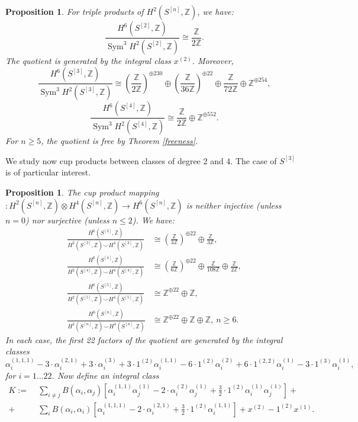 \documentclass{amsart}
\DeclareMathOperator{\Sym}{Sym}
\newcommand{\hilb}[1]{^{[#1]}}
\newcommand{\One}{1}
\newcommand{\IZ}{\mathbb{Z}}
\theoremstyle{plain}
\newtheorem{proposition}[theorem]{Proposition}
\theoremstyle{definition}
\theoremstyle{remark}
\begin{document}
\begin{proposition} For triple products of $H^2(S\hilb{n},\IZ)$, we have:
$$
\frac{H^6(S\hilb{2},\IZ)}{\Sym^3 H^2(S\hilb{2},\IZ)} \cong 
\frac{\IZ}{2\IZ}.
$$
The quotient is generated by the integral class $x^{(2)}$. Moreover,
$$
\frac{H^6(S\hilb{3},\IZ)}{\Sym^3 H^2(S\hilb{3},\IZ)} \cong  \left(\frac{\IZ}{2\IZ}\right)^{\oplus 230}\oplus \left(\frac{\IZ}{36\IZ}\right)^{\oplus 22}\oplus \frac{\IZ}{72\IZ} \oplus \IZ^{\oplus 254},
$$
$$
\frac{H^6(S\hilb{4},\IZ)}{\Sym^3 H^2(S\hilb{4},\IZ)} \cong  \frac{\IZ}{2\IZ} \oplus \IZ^{\oplus 552}.
$$
For $n\geq 5$, the quotient is free by Theorem \ref{freeness}.
\end{proposition}
We study now cup products between classes of degree 2 and 4. The case of $S\hilb{3}$ is of particular interest.
\begin{proposition} \label{p24}The cup product mapping $ : H^2(S\hilb{n},\IZ)\otimes H^4(S\hilb{n},\IZ) \rightarrow H^6(S\hilb{n},\IZ) $ is neither injective (unless $n=0$) nor surjective (unless $n\leq 2$). We have:
\setcounter{equation}{0} 
\begin{align} 
\frac{H^6(S\hilb{3},\IZ)}{H^2(S\hilb{3},\IZ)\smile H^4(S\hilb{3},\IZ)} &\cong \left(\frac{\IZ}{3\IZ}\right)^{\oplus 22} \oplus \frac{\IZ}{3\IZ},
\\
\frac{H^6(S\hilb{4},\IZ)}{H^2(S\hilb{4},\IZ)\smile H^4(S\hilb{4},\IZ)} &\cong  \left(\frac{\IZ}{6\IZ}\right)^{\oplus 22}\oplus\frac{\IZ}{108\IZ} \oplus\frac{\IZ}{2\IZ} ,
\\
\frac{H^6(S\hilb{5},\IZ)}{H^2(S\hilb{5},\IZ)\smile H^4(S\hilb{5},\IZ)} &\cong 
 \IZ^{\oplus 22} \oplus \IZ,
\\
\frac{H^6(S\hilb{n},\IZ)}{H^2(S\hilb{n},\IZ)\smile H^4(S\hilb{n},\IZ)} &\cong 
 \IZ^{\oplus 22} \oplus \IZ\oplus\IZ, \ n\geq 6.
\end{align}
In each case, the first 22 factors of the quotient are generated by the integral classes 
 $$
\alpha_i^{(1,1,1)} -3\cdot \alpha_i^{(2,1)} + 3\cdot \alpha_i^{(3)}+ 3 \cdot \One^{(2)}\alpha_i^{(1,1)} -6\cdot \One^{(2)}\alpha_i^{(2)}+6\cdot \One^{(2,2)}\alpha_i^{(1)}-3\cdot \One^{(3)}\alpha_i^{(1)},
$$ 
for $ i=1\ldots 22$. Now define an integral class
\begin{align*}
K:=&\;\sum_{i\neq j} B(\alpha_i,\alpha_j)\left[\alpha_i^{(1,1)}\alpha_j^{(1)} - 2\cdot\alpha_i^{(2)}\alpha_j^{(1)}+\frac{3}{2}\cdot \One^{(2)}\alpha_i^{(1)}\alpha_j^{(1)} \right] +\\
+&\;\sum_{i}B(\alpha_i,\alpha_i)\left[\alpha_i^{(1,1,1)} - 2\cdot\alpha_i^{(2,1)} + \frac{3}{2}\cdot \One^{(2)}\alpha_i^{(1,1)} \right]+  x^{(2)}-\One^{(2)}x^{(1)}.

\end{align*}
\end{proposition}
\end{document}
